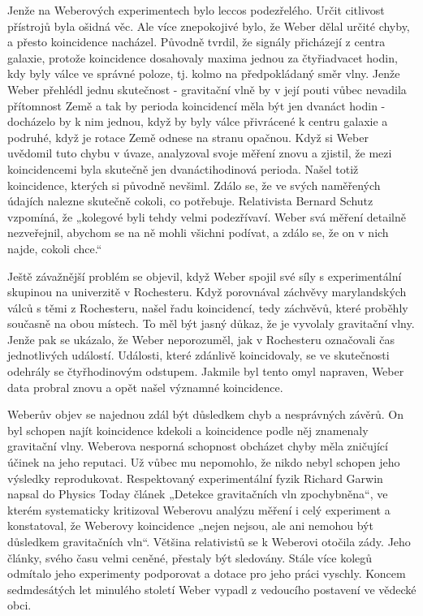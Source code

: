  Jenže na Weberových experimentech bylo leccos podezřelého. Určit citlivost přístrojů byla ošidná
  věc. Ale více znepokojivé bylo, že Weber dělal určité chyby, a přesto koincidence nacházel.
  Původně tvrdil, že signály přicházejí z centra galaxie, protože koincidence dosahovaly maxima
  jednou za čtyřiadvacet hodin, kdy byly válce ve správné poloze, tj. kolmo na předpokládaný směr
  vlny. Jenže Weber přehlédl jednu skutečnost - gravitační vlně by v její pouti vůbec nevadila
  přítomnost Země a tak by perioda koincidencí měla být jen dvanáct hodin - docházelo by k nim
  jednou, když by byly válce přivrácené k centru galaxie a podruhé, když je rotace Země odnese na
  stranu opačnou. Když si Weber uvědomil tuto chybu v úvaze, analyzoval svoje měření znovu a
  zjistil, že mezi koincidencemi byla skutečně jen dvanáctihodinová perioda. Našel totiž
  koincidence, kterých si původně nevšiml. Zdálo se, že ve svých naměřených údajích nalezne skutečně
  cokoli, co potřebuje. Relativista Bernard Schutz vzpomíná, že „kolegové byli tehdy velmi
  podezřívaví. Weber svá měření detailně nezveřejnil, abychom se na ně mohli všichni podívat, a
  zdálo se, že on v nich najde, cokoli chce.“

  Ještě závažnější problém se objevil, když Weber spojil své síly s experimentální skupinou na
  univerzitě v Rochesteru. Když porovnával záchvěvy marylandských válců s těmi z Rochesteru, našel
  řadu koincidencí, tedy záchvěvů, které proběhly současně na obou místech. To měl být jasný důkaz,
  že je vyvolaly gravitační vlny. Jenže pak se ukázalo, že Weber neporozuměl, jak v Rochesteru
  označovali čas jednotlivých událostí. Události, které zdánlivě koincidovaly, se ve skutečnosti
  odehrály se čtyřhodinovým odstupem. Jakmile byl tento omyl napraven, Weber data probral znovu a
  opět našel významné koincidence. 

  Weberův objev se najednou zdál být důsledkem chyb a nesprávných závěrů. On byl schopen najít
  koincidence kdekoli a koincidence podle něj znamenaly gravitační vlny. Weberova nesporná schopnost
  obcházet chyby měla zničující účinek na jeho reputaci. Už vůbec mu nepomohlo, že nikdo nebyl
  schopen jeho výsledky reprodukovat. Respektovaný experimentální fyzik Richard Garwin napsal do
  Physics Today článek „Detekce gravitačních vln zpochybněna“, ve kterém systematicky kritizoval
  Weberovu analýzu měření i celý experiment a konstatoval, že Weberovy koincidence „nejen nejsou,
  ale ani nemohou být důsledkem gravitačních vln“. Většina relativistů se k Weberovi otočila zády.
  Jeho články, svého času velmi ceněné, přestaly být sledovány. Stále více kolegů odmítalo jeho
  experimenty podporovat a dotace pro jeho práci vyschly. Koncem sedmdesátých let minulého století
  Weber vypadl z vedoucího postavení ve vědecké obci. 

